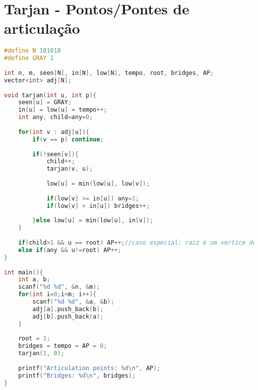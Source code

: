 \documentclass[12pt,a4paper,twoside]{report}
\begin{document}
\section{Tarjan - Pontos/Pontes de articulação}
\noindent\begin{lstlisting}[caption=Tarjan - Pontos/Pontes de articulação,language=C++]
#define N 101010
#define GRAY 1
 
int n, m, seen[N], in[N], low[N], tempo, root, bridges, AP;
vector<int> adj[N];
 
void tarjan(int u, int p){
    seen[u] = GRAY;
    in[u] = low[u] = tempo++;
    int any, child=any=0;
     
    for(int v : adj[u]){
        if(v == p) continue;
         
        if(!seen[v]){
            child++;
            tarjan(v, u);
             
            low[u] = min(low[u], low[v]);
             
            if(low[v] >= in[u]) any=1;
            if(low[v] > in[u]) bridges++;
         
        }else low[u] = min(low[u], in[v]);
    }
     
    if(child>1 && u == root) AP++;//caso especial: raiz é um vertice de articulacao
    else if(any && u!=root) AP++;
}
 
int main(){
    int a, b;
    scanf("%d %d", &n, &m);
    for(int i=0;i<m; i++){
        scanf("%d %d", &a, &b);
        adj[a].push_back(b);
        adj[b].push_back(a);
    }
     
    root = 1;
    bridges = tempo = AP = 0;
    tarjan(1, 0);
     
    printf("Articulation points: %d\n", AP);
    printf("Bridges: %d\n", bridges);
}
\end{lstlisting}
\end{document}

